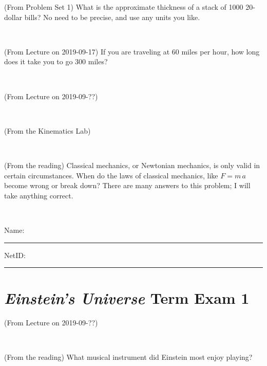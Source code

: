 \documentclass[12pt, letterpaper]{article}
\begin{document}
\begin{problem} (From Problem Set 1)
What is the approximate thickness of a stack of 1000 20-dollar bills?
No need to be precise, and use any units you like.
\end{problem}


\vfill ~


\clearpage


\begin{problem} (From Lecture on 2019-09-17)
If you are traveling at 60 miles per hour, how long does
it take you to go 300 miles?
\end{problem}


\vfill ~

\begin{problem} (From Lecture on 2019-09-??)
\end{problem}


\vfill ~

\begin{problem} (From the Kinematics Lab)

\end{problem}


\vfill ~

\begin{problem} (From the reading)
Classical mechanics, or Newtonian mechanics, is only valid in certain
circumstances. When do the laws of classical mechanics, like $F =
m\,a$ become wrong or break down? There are many answers to this
problem; I will take anything correct.
\end{problem}


\vfill ~


\cleardoublepage



\noindent
Name: \rule[-1ex]{0.60\textwidth}{0.1pt}
NetID: \rule[-1ex]{0.20\textwidth}{0.1pt}

\section*{\textsl{Einstein's Universe} Term Exam 1}
\setcounter{problem}{1}


\begin{problem} (From Lecture on 2019-09-??)
\end{problem}


\vfill ~

\begin{problem} (From the reading)
What musical instrument did Einstein most enjoy playing?
\end{problem}
\end{document}
